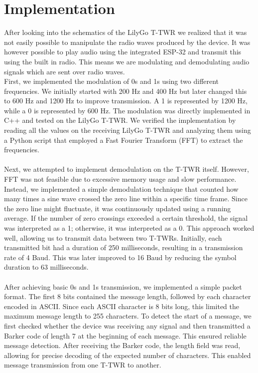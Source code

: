 \section{Implementation}
After looking into the schematics\cite{lilygo2024} of the LilyGo T-TWR we realized that it was not easily possible to manipulate the radio waves produced by the device. It was however possible to play audio using the integrated ESP-32 and transmit this using the built in radio. This means we are modulating and demodulating audio signals which are sent over radio waves.
\\
First, we implemented the modulation of 0s and 1s using two different frequencies. We initially started with 200 Hz and 400 Hz but later changed this to 600 Hz and 1200 Hz to improve transmission. A 1 is represented by 1200 Hz, while a 0 is represented by 600 Hz. The modulation was directly implemented in C++ and tested on the LilyGo T-TWR. We verified the implementation by reading all the values on the receiving LilyGo T-TWR and analyzing them using a Python script that employed a Fast Fourier Transform (FFT) to extract the frequencies.
\\ \\
Next, we attempted to implement demodulation on the T-TWR itself. However, FFT was not feasible due to excessive memory usage and slow performance. Instead, we implemented a simple demodulation technique that counted how many times a sine wave crossed the zero line within a specific time frame. Since the zero line might fluctuate, it was continuously updated using a running average. If the number of zero crossings exceeded a certain threshold, the signal was interpreted as a 1; otherwise, it was interpreted as a 0. This approach worked well, allowing us to transmit data between two T-TWRs. Initially, each transmitted bit had a duration of 250 milliseconds, resulting in a transmission rate of 4 Baud. This was later improved to 16 Baud by reducing the symbol duration to 63 milliseconds.
\\ \\
After achieving basic 0s and 1s transmission, we implemented a simple packet format. The first 8 bits contained the message length, followed by each character encoded in ASCII. Since each ASCII character is 8 bits long, this limited the maximum message length to 255 characters. To detect the start of a message, we first checked whether the device was receiving any signal and then transmitted a Barker code of length 7 at the beginning of each message. This ensured reliable message detection. After receiving the Barker code, the length field was read, allowing for precise decoding of the expected number of characters. This enabled message transmission from one T-TWR to another.
